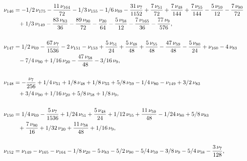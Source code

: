 \documentclass[a4paper,12pt, DIV=14, BCOR=5mm, twoside, headsepline, numbers=noenddot]{scrbook}
\begin{document}
\begin{align}
\begin{aligned}
\\
\nu_{{146}}&=-1/2\,\nu_{{175}}-{\frac {11
\,\nu_{{164}}}{72}}-1/3\,\nu_{{155}}-1/6\,\nu_{{69}}-{\frac {31\,\nu_{
{7}}}{1152}}+{\frac {7\,\nu_{{51}}}{72}}+{\frac {7\,\nu_{{48}}}{144}}+
{\frac {7\,\nu_{{55}}}{144}}-{\frac {5\,\nu_{{59}}}{12}}-{\frac {7\,
\nu_{{80}}}{72}}\\
 &\hphantom{=}+1/3\,\nu_{{149}}-{\frac {83\,\nu_{{83}}}{36}}-{\frac 
{89\,\nu_{{90}}}{72}}-{\frac {\nu_{{20}}}{64}}-{\frac {5\,\nu_{{58}}}{
12}}-{\frac {7\,\nu_{{165}}}{36}}-{\frac {77\,\nu_{{9}}}{576}}, \\
\\
\nu_{{
147}}&=1/2\,\nu_{{69}}-{\frac {67\,\nu_{{7}}}{1536}}-2\,\nu_{{151}}-\nu
_{{153}}+{\frac {5\,\nu_{{51}}}{24}}+{\frac {5\,\nu_{{48}}}{48}}+{
\frac {5\,\nu_{{55}}}{48}}-{\frac {47\,\nu_{{59}}}{48}}-{\frac {5\,\nu
_{{80}}}{24}}+\nu_{{160}}-4\,\nu_{{83}}\\
 &\hphantom{=}-7/4\,\nu_{{90}}+1/16\,\nu_{{20
}}-{\frac {47\,\nu_{{58}}}{48}}-3/16\,\nu_{{9}}, \\
\\
\nu_{{148}}&=-{\frac {
\nu_{{7}}}{256}}+1/4\,\nu_{{51}}+1/8\,\nu_{{48}}+1/8\,\nu_{{55}}+5/8\,
\nu_{{59}}-1/4\,\nu_{{80}}-\nu_{{149}}+3/2\,\nu_{{83}}\\
 &\hphantom{=}+3/4\,\nu_{{90}}
+1/16\,\nu_{{20}}+5/8\,\nu_{{58}}+1/8\,\nu_{{9}}, \\
\\
\nu_{{150}}&=1/4\,\nu_
{{69}}-{\frac {5\,\nu_{{7}}}{1536}}+1/24\,\nu_{{51}}+{\frac {5\,\nu_{{
48}}}{24}}+1/12\,\nu_{{55}}+{\frac {11\,\nu_{{59}}}{48}}-1/24\,\nu_{{
80}}+5/8\,\nu_{{83}}\\
 &\hphantom{=}+{\frac {7\,\nu_{{90}}}{16}}+1/32\,\nu_{{20}}+{
\frac {11\,\nu_{{58}}}{48}}+1/16\,\nu_{{9}}, \\
\\
\nu_{{152}}&=\nu_{{149}}-
\nu_{{165}}-\nu_{{164}}-1/8\,\nu_{{20}}-5\,\nu_{{83}}-5/2\,\nu_{{90}}-
5/4\,\nu_{{59}}-3/8\,\nu_{{9}}-5/4\,\nu_{{58}}-{\frac {3\,\nu_{{7}}}{
128}}, 
\end{aligned}
\end{align}
\end{document}
